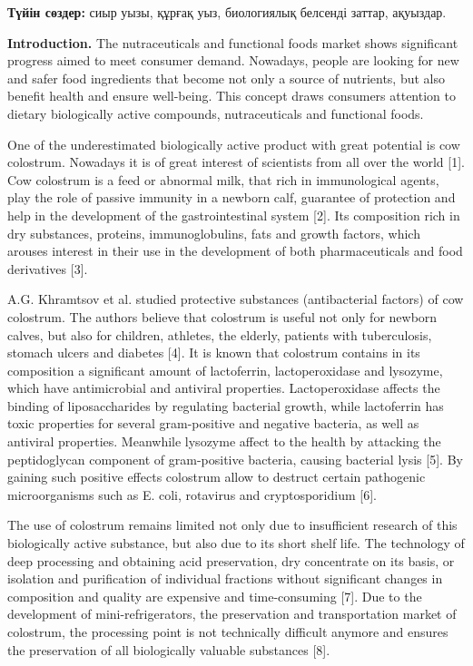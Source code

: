 {\bfseries Түйін сөздер:} сиыр уызы, құрғақ уыз, биологиялық белсенді
заттар, ақуыздар.

\begin{multicols}{2}
{\bfseries Introduction.} The nutraceuticals and functional foods market
shows significant progress aimed to meet consumer demand. Nowadays,
people are looking for new and safer food ingredients that become not
only a source of nutrients, but also benefit health and ensure
well-being. This concept draws consumers\textquotesingle{} attention to
dietary biologically active compounds, nutraceuticals and functional
foods.

One of the underestimated biologically active product with great
potential is cow colostrum. Nowadays it is of great interest of
scientists from all over the world {[}1{]}. Cow colostrum is a feed or
abnormal milk, that rich in immunological agents, play the role of
passive immunity in a newborn calf, guarantee of protection and help in
the development of the gastrointestinal system {[}2{]}. Its composition
rich in dry substances, proteins, immunoglobulins, fats and growth
factors, which arouses interest in their use in the development of both
pharmaceuticals and food derivatives {[}3{]}.

A.G. Khramtsov et al. studied protective substances (antibacterial
factors) of cow colostrum. The authors believe that colostrum is useful
not only for newborn calves, but also for children, athletes, the
elderly, patients with tuberculosis, stomach ulcers and diabetes
{[}4{]}. It is known that colostrum contains in its composition a
significant amount of lactoferrin, lactoperoxidase and lysozyme, which
have antimicrobial and antiviral properties. Lactoperoxidase affects the
binding of liposaccharides by regulating bacterial growth, while
lactoferrin has toxic properties for several gram-positive and negative
bacteria, as well as antiviral properties. Meanwhile lysozyme affect to
the health by attacking the peptidoglycan component of gram-positive
bacteria, causing bacterial lysis {[}5{]}. By gaining such positive
effects colostrum allow to destruct certain pathogenic microorganisms
such as E. coli, rotavirus and cryptosporidium {[}6{]}.

The use of colostrum remains limited not only due to insufficient
research of this biologically active substance, but also due to its
short shelf life. The technology of deep processing and obtaining acid
preservation, dry concentrate on its basis, or isolation and
purification of individual fractions without significant changes in
composition and quality are expensive and time-consuming {[}7{]}. Due to
the development of mini-refrigerators, the preservation and
transportation market of colostrum, the processing point is not
technically difficult anymore and ensures the preservation of all
biologically valuable substances {[}8{]}.


\end{multicols}
